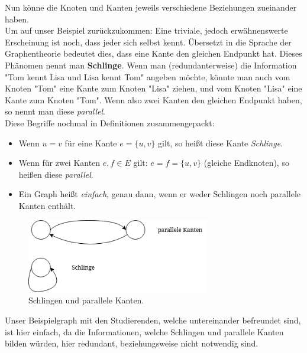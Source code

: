 \documentclass{article}
\theoremstyle{plain}
\begin{document}
\newpage
Nun könne die Knoten und Kanten jeweils verschiedene Beziehungen zueinander haben.\\
Um auf unser Beispiel zurückzukommen: Eine triviale, jedoch erwähnenswerte Erscheinung ist noch, dass jeder sich selbst kennt. Übersetzt in die Sprache der Graphentheorie bedeutet dies, dass eine Kante den gleichen Endpunkt hat. Dieses Phänomen nennt man \textbf{Schlinge}.
\bigskip
Wenn man (redundanterweise) die Information "Tom kennt Lisa und Lisa kennt Tom" angeben möchte, könnte man auch vom Knoten "Tom" eine Kante zum Knoten "Lisa" ziehen, und vom Knoten "Lisa" eine Kante zum Knoten "Tom". Wenn also zwei Kanten den gleichen Endpunkt haben, so nennt man diese \textit{parallel}.\\
\bigskip
Diese Begriffe nochmal in Definitionen zusammengepackt:\\
\begin{itemize}
	\item Wenn \(u = v\) für eine Kante \(e = \{u, v\}\) gilt, so heißt diese Kante \textit{Schlinge}.
	\item Wenn für zwei Kanten \(e, f \in E\) gilt: \(e = f = \{u, v\}\) (gleiche Endknoten), so heißen diese \textit{parallel}. 
	\item Ein Graph heißt \textit{einfach}, genau dann, wenn er weder Schlingen noch parallele Kanten enthält.\cite[S.~2]{bue_1}
\end{itemize}
\begin{figure}[!htp]
    \centering
    \includegraphics[width=8cm]{vortrag_schriftlich/images/graph_two.drawio.png}
    \caption{Schlingen und parallele Kanten.}
    \label{fig:fig2}
\end{figure}
Unser Beispielgraph mit den Studierenden, welche untereinander befreundet sind, ist hier einfach, da die Informationen, welche Schlingen und parallele Kanten bilden würden, hier redundant, beziehungsweise nicht notwendig sind.\\
\end{document}
